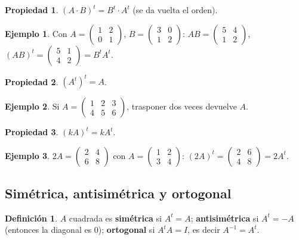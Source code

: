 \documentclass[a4paper,12pt]{article}
\theoremstyle{definition}
\newtheorem{definicion}{Definición}[section]
\newtheorem{ejemplo}{Ejemplo}[section]
\newtheorem{propiedad}{Propiedad}[section]
\begin{document}
\begin{propiedad}
$(A \cdot B)^t = B^t \cdot A^t$ (se da vuelta el orden).
\end{propiedad}
\begin{ejemplo}
Con $A=\begin{pmatrix} 1 & 2 \\ 0 & 1 \end{pmatrix}$, $B=\begin{pmatrix} 3 & 0 \\ 1 & 2 \end{pmatrix}$: $AB=\begin{pmatrix} 5 & 4 \\ 1 & 2 \end{pmatrix}$, $(AB)^t=\begin{pmatrix} 5 & 1 \\ 4 & 2 \end{pmatrix}=B^tA^t$.
\end{ejemplo}

\begin{propiedad}
$(A^t)^t = A$.
\end{propiedad}
\begin{ejemplo}
Si $A=\begin{pmatrix} 1 & 2 & 3 \\ 4 & 5 & 6 \end{pmatrix}$, trasponer dos veces devuelve $A$.
\end{ejemplo}

\begin{propiedad}
$(kA)^t = kA^t$.
\end{propiedad}
\begin{ejemplo}
$2A = \begin{pmatrix} 2 & 4 \\ 6 & 8 \end{pmatrix}$ con $A=\begin{pmatrix} 1 & 2 \\ 3 & 4 \end{pmatrix}$: $(2A)^t=\begin{pmatrix} 2 & 6 \\ 4 & 8 \end{pmatrix}=2A^t$.
\end{ejemplo}

\subsection{Simétrica, antisimétrica y ortogonal}
\begin{definicion}
$A$ cuadrada es \textbf{simétrica} si $A^t=A$; \textbf{antisimétrica} si $A^t=-A$ (entonces la diagonal es $0$); \textbf{ortogonal} si $A^t A = I$, es decir $A^{-1}=A^t$.
\end{definicion}
\end{document}
